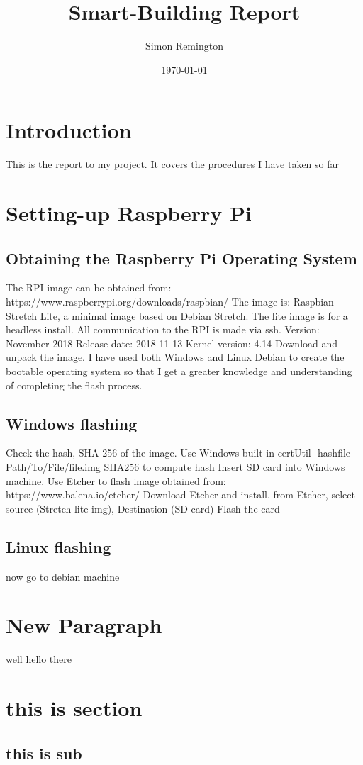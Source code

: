\documentclass[a4paper,12pt]{article}
\begin{document}
	\pagestyle{empty}%
\title{Smart-Building Report}
\author{Simon Remington}
\date{\today}
\maketitle
\newpage

\tableofcontents
\newpage

\section{Introduction}
This is the report to my project. It covers the procedures I have taken so far
\section{Setting-up Raspberry Pi}
\subsection{Obtaining the Raspberry Pi Operating System}
The RPI image can be obtained from:
\newline
https://www.raspberrypi.org/downloads/raspbian/
\newline
The image is:
Raspbian Stretch Lite, a minimal image based on Debian Stretch.
The lite image is for a headless install. All communication to the RPI is made via ssh.
\newline
Version: November 2018
\newline
Release date: 2018-11-13
\newline
Kernel version: 4.14 
\newline
Download and unpack the image.
\newline
I have used both Windows and Linux Debian to create the bootable operating system so that I get a greater knowledge and understanding of completing the flash process.
\subsection{Windows flashing}
Check the hash, SHA-256 of the image.
\newline
Use Windows built-in certUtil -hashfile Path/To/File/file.img SHA256 to compute hash
Insert SD card into Windows machine.
Use Etcher to flash image obtained from: https://www.balena.io/etcher/
Download Etcher and install.
\newline
from Etcher, select source (Stretch-lite img), Destination (SD card)
Flash the card
\subsection{Linux flashing}
now go to debian machine
\newpage
\section{New Paragraph}
well hello there
\pagebreak
\section{this is section}
\subsection{this is sub}
\end{document}
